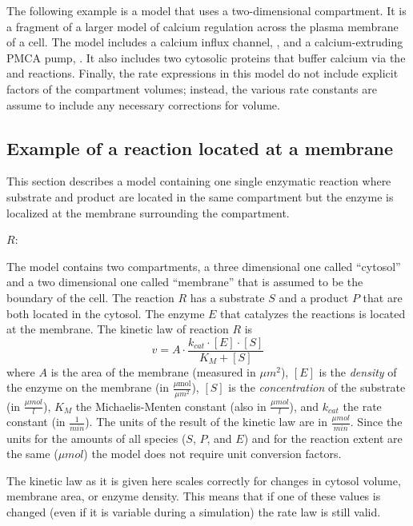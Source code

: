 The following example is a model that uses a two-dimensional
compartment.  It is a fragment of a larger model of calcium
regulation across the plasma membrane of a cell.  The model
includes a calcium influx channel, , and a
calcium-extruding PMCA pump, .  It also includes two
cytosolic proteins that buffer calcium via the
 and
 reactions.  Finally, the
rate expressions in this model do not include explicit factors of
the compartment volumes; instead, the various rate constants are
assume to include any necessary corrections for volume.


\subsection{Example of a reaction located at a membrane}

\label{sec:reaction-membrane-eg}This section describes a model containing
one single enzymatic reaction where substrate and product are located
in the same compartment but the enzyme is localized at the membrane
surrounding the compartment.

\begin{center}
$R$: 
\par\end{center}

The model contains two compartments, a three dimensional one called
{}``cytosol'' and a two dimensional one called {}``membrane''
that is assumed to be the boundary of the cell. The reaction $R$
has a substrate $S$ and a product $P$ that are both located in the
cytosol. The enzyme $E$ that catalyzes the reactions is located at
the membrane. The kinetic law of reaction $R$ is\[
v=A\cdot\frac{k_{cat}\cdot[E]\cdot[S]}{K_{M}+[S]}\]
where $A$ is the area of the membrane (measured in $\mu m^{2}$),
$[E]$ is the \emph{density }of the enzyme on the membrane (in $\frac{\mu\mathrm{mol}}{\mu m^{2}}$),
$[S]$ is the \emph{concentration }of the substrate (in $\frac{\mu mol}{l}$),
$K_{M}$ the Michaelis-Menten constant (also in $\frac{\mu mol}{l}$),
and $k_{cat}$ the rate constant (in $\frac{1}{min}$). The units
of the result of the kinetic law are in $\frac{\mu mol}{min}$. Since
the units for the amounts of all species ($S$, $P$, and $E$) and
for the reaction extent are the same ($\mu mol$) the model does not
require unit conversion factors. 

The kinetic law as it is given here scales correctly for changes in
cytosol volume, membrane area, or enzyme density. This means that
if one of these values is changed (even if it is variable during a
simulation) the rate law is still valid.


